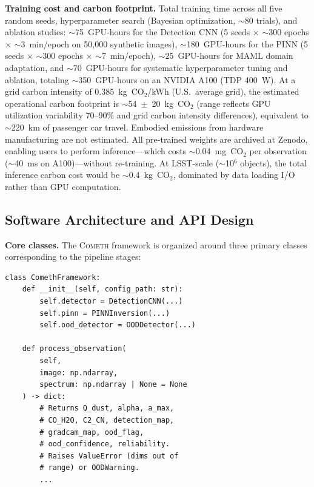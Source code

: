 \documentclass[usenatbib]{mnras}
\begin{document}
\textbf{Training cost and carbon footprint.} Total training time across all five random seeds, hyperparameter search (Bayesian optimization, $\sim$80 trials), and ablation studies: $\sim$75~GPU-hours for the Detection CNN (5 seeds $\times$ $\sim$300 epochs $\times$ $\sim$3~min/epoch on 50,000 synthetic images), $\sim$180~GPU-hours for the PINN (5 seeds $\times$ $\sim$300 epochs $\times$ $\sim$7~min/epoch), $\sim$25~GPU-hours for MAML domain adaptation, and $\sim$70~GPU-hours for systematic hyperparameter tuning and ablation, totaling $\sim$350~GPU-hours on an NVIDIA A100 (TDP 400~W). At a grid carbon intensity of 0.385~kg~CO$_2$/kWh (U.S.\ average grid), the estimated operational carbon footprint is $\sim$54~$\pm$~20~kg~CO$_2$ (range reflects GPU utilization variability 70--90\% and grid carbon intensity differences), equivalent to $\sim$220~km of passenger car travel. Embodied emissions from hardware manufacturing are not estimated. All pre-trained weights are archived at Zenodo, enabling users to perform inference---which costs $\sim$0.04~mg~CO$_2$ per observation ($\sim$40~ms on A100)---without re-training. At LSST-scale ($\sim$10$^6$ objects), the total inference carbon cost would be $\sim$0.4~kg~CO$_2$, dominated by data loading I/O rather than GPU computation.

\subsection{Software Architecture and API Design}\label{sec:api}

\textbf{Core classes.} The \textsc{Cometh} framework is organized around three primary classes corresponding to the pipeline stages:

{\footnotesize
\begin{verbatim}
class ComethFramework:
    def __init__(self, config_path: str):
        self.detector = DetectionCNN(...)
        self.pinn = PINNInversion(...)
        self.ood_detector = OODDetector(...)

    def process_observation(
        self,
        image: np.ndarray,
        spectrum: np.ndarray | None = None
    ) -> dict:
        # Returns Q_dust, alpha, a_max,
        # CO_H2O, C2_CN, detection_map,
        # gradcam_map, ood_flag,
        # ood_confidence, reliability.
        # Raises ValueError (dims out of
        # range) or OODWarning.
        ...
\end{verbatim}
}
\end{document}
